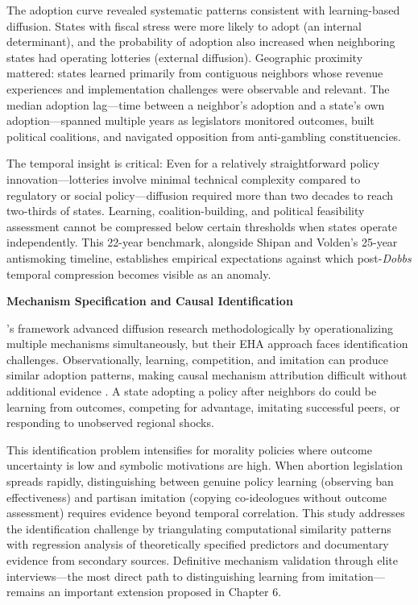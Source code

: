 The adoption curve revealed systematic patterns consistent with learning-based diffusion. States with fiscal stress were more likely to adopt (an internal determinant), and the probability of adoption also increased when neighboring states had operating lotteries (external diffusion). Geographic proximity mattered: states learned primarily from contiguous neighbors whose revenue experiences and implementation challenges were observable and relevant. The median adoption lag---time between a neighbor's adoption and a state's own adoption---spanned multiple years as legislators monitored outcomes, built political coalitions, and navigated opposition from anti-gambling constituencies.

The temporal insight is critical: Even for a relatively straightforward policy innovation---lotteries involve minimal technical complexity compared to regulatory or social policy---diffusion required more than two decades to reach two-thirds of states. Learning, coalition-building, and political feasibility assessment cannot be compressed below certain thresholds when states operate independently. This 22-year benchmark, alongside Shipan and Volden's 25-year antismoking timeline, establishes empirical expectations against which post-\emph{Dobbs} temporal compression becomes visible as an anomaly.

\textbf{Mechanism Specification and Causal Identification}

\textcite{berryStateLotteryAdoptions1990}'s framework advanced diffusion research methodologically by operationalizing multiple mechanisms simultaneously, but their EHA approach faces identification challenges. Observationally, learning, competition, and imitation can produce similar adoption patterns, making causal mechanism attribution difficult without additional evidence \parencite{boehmkeStatePolicyInnovativeness2012a}. A state adopting a policy after neighbors do could be learning from outcomes, competing for advantage, imitating successful peers, or responding to unobserved regional shocks.

This identification problem intensifies for morality policies where outcome uncertainty is low and symbolic motivations are high. When abortion legislation spreads rapidly, distinguishing between genuine policy learning (observing ban effectiveness) and partisan imitation (copying co-ideologues without outcome assessment) requires evidence beyond temporal correlation. This study addresses the identification challenge by triangulating computational similarity patterns with regression analysis of theoretically specified predictors and documentary evidence from secondary sources. Definitive mechanism validation through elite interviews---the most direct path to distinguishing learning from imitation---remains an important extension proposed in Chapter 6.

